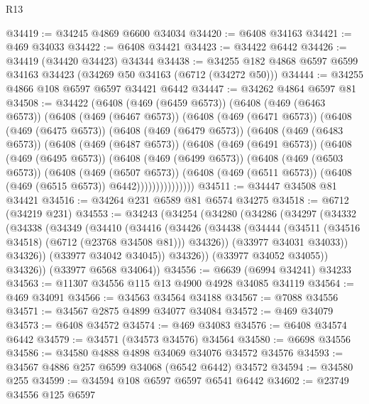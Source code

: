\begin{lexlean}{R13}
\begin{coremodule}
@34419 := @34245 @4869 @6600 @34034
@34420 := @6408 @34163
@34421 := @469 @34033
@34422 := @6408 @34421
@34423 := @34422 @6442
@34426 := @34419 (@34420 @34423) @34344
@34438 := @34255 @182 @4868 @6597 @6599 @34163 @34423 (@34269 @50 @34163 (@6712 (@34272 @50)))
@34444 := @34255 @4866 @108 @6597 @6597 @34421 @6442
@34447 := @34262 @4864 @6597 @81
@34508 := @34422
    (@6408
      (@469 (@6459 @6573))
      (@6408
        (@469 (@6463 @6573))
        (@6408
          (@469 (@6467 @6573))
          (@6408
            (@469 (@6471 @6573))
            (@6408
              (@469 (@6475 @6573))
              (@6408
                (@469 (@6479 @6573))
                (@6408
                  (@469 (@6483 @6573))
                  (@6408
                    (@469 (@6487 @6573))
                    (@6408
                      (@469 (@6491 @6573))
                      (@6408
                        (@469 (@6495 @6573))
                        (@6408
                          (@469 (@6499 @6573))
                          (@6408
                            (@469 (@6503 @6573))
                            (@6408
                              (@469 (@6507 @6573))
                              (@6408
                                (@469 (@6511 @6573))
                                (@6408 (@469 (@6515 @6573)) @6442)))))))))))))))
@34511 := @34447 @34508 @81 @34421
@34516 := @34264 @231 @6589 @81 @6574 @34275
@34518 := @6712 (@34219 @231)
@34553 := @34243
    (@34254
      (@34280
        (@34286
          (@34297
            (@34332
              (@34338
                (@34349
                  (@34410
                    (@34416
                      (@34426
                        (@34438
                          (@34444 (@34511 (@34516 @34518) (@6712 (@23768 @34508 @81))) @34326))
                        (@33977 @34031 @34033))
                      @34326))
                  (@33977 @34042 @34045))
                @34326))
            (@33977 @34052 @34055))
          @34326))
      (@33977 @6568 @34064))
@34556 := @6639 (@6994 @34241) @34233
@34563 := @11307 @34556 @115 @13 @4900 @4928 @34085 @34119
@34564 := @469 @34091
@34566 := @34563 @34564 @34188
@34567 := @7088 @34556
@34571 := @34567 @2875 @4899 @34077 @34084
@34572 := @469 @34079
@34573 := @6408 @34572
@34574 := @469 @34083
@34576 := @6408 @34574 @6442
@34579 := @34571 (@34573 @34576) @34564
@34580 := @6698 @34556
@34586 := @34580 @4888 @4898 @34069 @34076 @34572 @34576
@34593 := @34567 @4886 @257 @6599 @34068 (@6542 @6442) @34572
@34594 := @34580 @255
@34599 := @34594 @108 @6597 @6597 @6541 @6442
@34602 := @23749 @34556 @125 @6597

\end{coremodule}
\end{lexlean}
